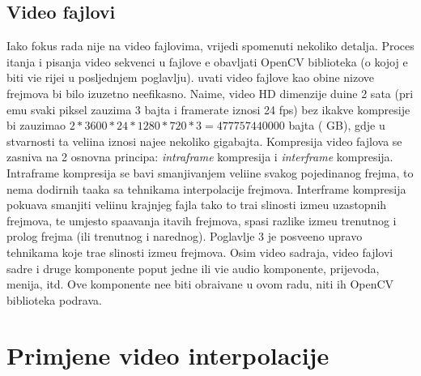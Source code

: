 \subsection{Video fajlovi}
Iako fokus rada nije na video fajlovima, vrijedi spomenuti nekoliko detalja. Proces \ch itanja i pisanja video sekvenci u fajlove \cj e obavljati OpenCV biblioteka (o kojoj \cj e biti vi\sh e rije\ch i u 
posljednjem poglavlju). \CH uvati video fajlove kao obi\ch ne nizove frejmova bi bilo izuzetno neefikasno. Naime, video HD dimenzije du\zh ine 2 sata (pri \ch emu svaki piksel zauzima 3 bajta i
framerate iznosi 24 fps) bez ikakve kompresije bi zauzimao $2 * 3600 * 24 * 1280 * 720 * 3 = 477757440000$ bajta ( GB), gdje u stvarnosti ta veli\ch ina iznosi naj\ch e\sh \cj e 
nekoliko gigabajta. Kompresija video fajlova se zasniva na 2 osnovna principa: \textit{intraframe} kompresija i \textit{interframe} kompresija. Intraframe kompresija se bavi smanjivanjem veli\ch ine
svakog pojedina\ch nog frejma, \sh to nema dodirnih ta\ch aka sa tehnikama interpolacije frejmova. Interframe kompresija poku\sh ava smanjiti veli\ch inu krajnjeg fajla tako \sh to tra\zh i sli\ch nosti
izme\dj u uzastopnih frejmova, te umjesto spa\sh avanja \ch itavih frejmova, spasi razlike izme\dj u trenutnog i pro\sh log frejma (ili trenutnog i narednog). Poglavlje 3 je posve\cj eno upravo tehnikama
koje tra\zh e sli\ch nosti izme\dj u frejmova. Osim video sadr\zh aja, video fajlovi sadr\zh e i druge komponente poput jedne ili vi\sh e audio komponente, prijevoda, menija, itd. Ove komponente
ne\cj e biti obra\dj ivane u ovom radu, niti ih OpenCV biblioteka podr\zh ava.

\section{Primjene video interpolacije}

